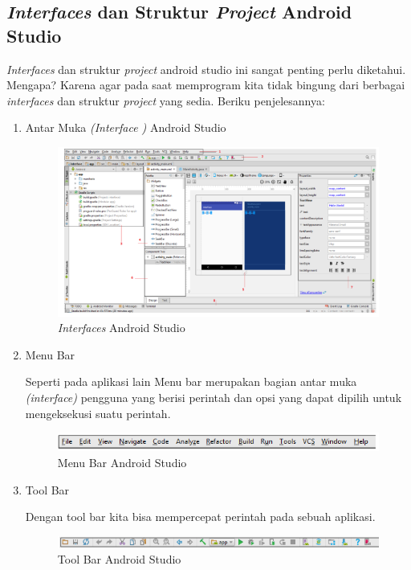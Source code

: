 \subsection{\textit{Interfaces} dan Struktur \textit{Project} Android Studio}
\par \textit{Interfaces} dan struktur \textit{project} android studio ini sangat penting perlu diketahui. Mengapa? Karena agar pada saat memprogram kita tidak bingung dari berbagai \textit{interfaces} dan struktur \textit{project} yang sedia. Beriku penjelesannya:
\begin{enumerate}
    \item Antar Muka \textit{(Interface )} Android Studio
     \begin{figure}[H]
    \centering
    \includegraphics[width=1\textwidth]{figures/android13.png}
    \caption{\textit{Interfaces} Android Studio}
    \label{print}
    \end{figure}
    
    \item  Menu Bar 
    \par Seperti pada aplikasi lain Menu bar merupakan bagian antar muka \textit{(interface)} pengguna yang berisi perintah dan opsi yang dapat dipilih untuk mengeksekusi suatu perintah.
     \begin{figure}[H]
    \centering
    \includegraphics[width=1\textwidth]{figures/android14.png}
    \caption{Menu Bar Android Studio}
    \label{print}
    \end{figure}
    
    \item  Tool Bar
    \par Dengan tool bar kita bisa mempercepat perintah pada sebuah aplikasi.
    \begin{figure}[H]
    \centering
    \includegraphics[width=1\textwidth]{figures/android15.png}
    \caption{Tool Bar Android Studio}
    \label{print}
    \end{figure}
    

\end{enumerate}
